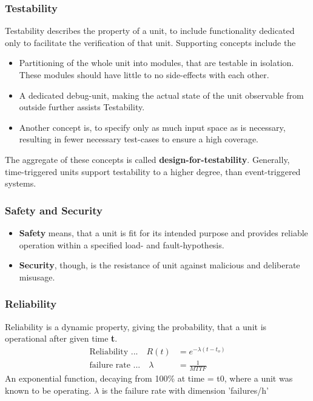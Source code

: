 	\subsubsection{Testability}
	{Testability} describes the property of a unit, to include functionality dedicated only to facilitate the verification of that unit. Supporting concepts include the \\
	\begin{itemize}
		\item Partitioning of the whole unit into modules, that are testable in isolation. These modules should have little to no side-effects with each other. 
		\item A dedicated debug-unit, making the actual state of the unit observable from outside further assists Testability. 
		\item Another concept is, to specify only as much input space as is necessary, resulting in fewer necessary test-cases to ensure a high coverage.
	\end{itemize}

	The aggregate of these concepts is called {\bf design-for-testability}.
	Generally, time-triggered units support testability to a higher degree, than event-triggered systems.
	\subsubsection{Safety and Security}
	\begin{itemize}
		\item {\bf Safety} means, that a unit is fit for its intended purpose and provides reliable operation within a specified load- and fault-hypothesis.
		\item {\bf Security}, though, is the resistance of unit against malicious and deliberate misusage.
	\end{itemize}
	\subsubsection{Reliability}
	{Reliability} is a dynamic property, giving the probability, that a unit is operational after given time {\bf t}.
		\begin{align*}
		\textrm{Reliability ...} \quad R(t) & = e^{-\lambda (t-t_o) }\\
		\textrm{failure rate ...}  \quad \lambda & = \frac{1}{MTTF} 
		\end{align*}
	An exponential function, decaying from 100\% at time = t0, where a unit was known to be operating. $\lambda$ is the failure rate with dimension 'failures/h'
	
